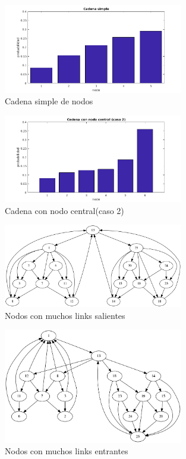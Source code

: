 \begin{figure}[H]
	\centering
	\includegraphics[width=0.7\textwidth]{img/barrascadena4.png}
	\caption{Cadena simple de nodos}
	\label{fig:Ranking cadena simple}
\end{figure}


\begin{figure}[H]
	\centering
	\includegraphics[width=0.7\textwidth]{img/cadena6v2.png}
	\caption{Cadena con nodo central(caso 2)}
	\label{fig:Ranking cadena con nodo central}
\end{figure}


\begin{figure}[H]
	\centering
	\includegraphics[width=0.7\textwidth]{img/links_salientes_25.png}
	\caption{Nodos con muchos links salientes}
	\label{fig:Ranking nodos con muchos links salientes}
\end{figure}



\begin{figure}[H]
	\centering
	\includegraphics[width=0.7\textwidth]{img/links_entrantes_25.png}
	\caption{Nodos con muchos links entrantes}
	\label{fig:Ranking nodos con muchos links entrantes}
\end{figure}

